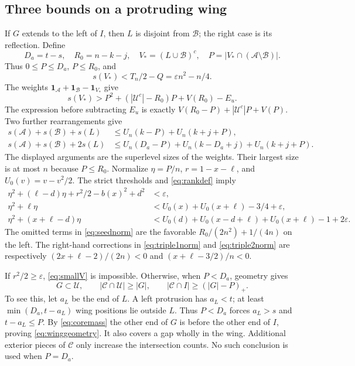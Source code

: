 \documentclass[10pt]{amsart}
\theoremstyle{remark}
\newcommand{\ind}{\mathbf 1}
\newcommand{\Uset}{\mathcal U}
\newcommand{\Cset}{\mathcal C}
\newcommand{\Bset}{\mathcal B}
\newcommand{\Aset}{\mathcal A}
\begin{document}
\subsection{Three bounds on a protruding wing}
If $G$ extends to the left of $I$, then $L$ is disjoint from $\Bset$;
the right case is its reflection. Define
\[
 D_a=t-s,\quad R_0=n-k-j,\quad
 V_*= (L\cup\Bset)^c,\quad P=|V_*\cap(\Aset\setminus\Bset)|.
\]
Thus $0\le P\le D_a$, $P\le R_0$, and
\begin{equation}\label{eq:smallV}
 s(V_*)<T_n/2-Q=\varepsilon n^2-n/4.
\end{equation}
The weights $\ind_{\Aset}+\ind_{\Bset}-\ind_{V_*}$ give
\begin{equation}\label{eq:wingseed}
 s(V_*)>P^2+(|\Uset^c|-R_0)P+V(R_0)-E_u.
\end{equation}
The expression before subtracting $E_u$ is exactly
$V(R_0-P)+|\Uset^c|P+V(P)$.
Two further rearrangements give
\begin{align}
 s(\Aset)+s(\Bset)+s(L)&\le U_n(k-P)+U_n(k+j+P),\label{eq:triple1}\\
 s(\Aset)+s(\Bset)+2s(L)&\le
 U_n(D_a-P)+U_n(k-D_a+j)+U_n(k+j+P).\label{eq:triple2}
\end{align}
The displayed arguments are the superlevel sizes of the weights.
Their largest size is at most $n$ because $P\le R_0$.
Normalize $\eta=P/n$, $r=1-x-\ell$, and $U_0(v)=v-v^2/2$.
The strict thresholds and \eqref{eq:rankdef} imply
\begin{align}
 \eta^2+(\ell-d)\eta+r^2/2-b(x)^2+d^2&<\varepsilon,\label{eq:seednorm}\\
 \eta^2+\ell\eta&<U_0(x)+U_0(x+\ell)-3/4+\varepsilon,\label{eq:triple1norm}\\
 \eta^2+(x+\ell-d)\eta&<
 U_0(d)+U_0(x-d+\ell)+U_0(x+\ell)-1+2\varepsilon.\label{eq:triple2norm}
\end{align}
The omitted terms in \eqref{eq:seednorm} are the favorable
$R_0/(2n^2)+1/(4n)$ on the left. The right-hand corrections in
\eqref{eq:triple1norm} and \eqref{eq:triple2norm} are respectively
$(2x+\ell-2)/(2n)<0$ and $(x+\ell-3/2)/n<0$.

If $r^2/2\ge\varepsilon$, \eqref{eq:smallV} is impossible.
Otherwise, when $P<D_a$, geometry gives
\begin{equation}\label{eq:winggeometry}
 G\subset\Uset,\qquad |\Cset\cap\Uset|\ge|G|,\qquad
 |\Cset\cap I|\ge(|G|-P)_+.
\end{equation}
To see this, let $a_L$ be the end of $L$. A left protrusion has
$a_L<t$; at least $\min(D_a,t-a_L)$ wing positions lie outside $L$.
Thus $P<D_a$ forces $a_L>s$ and $t-a_L\le P$.
By \eqref{eq:coremass} the other end of $G$ is before the other end of
$I$, proving \eqref{eq:winggeometry}. It also covers a gap wholly in
the wing. Additional exterior pieces of $\Cset$ only increase the
intersection counts. No such conclusion is used when $P=D_a$.
\end{document}
